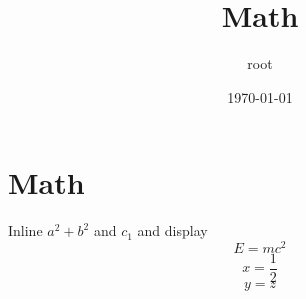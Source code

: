 \documentclass[11pt]{article}
\author{root}
\date{\today}
\title{Math}
\begin{document}
\maketitle
\tableofcontents

\section{Math}
\label{sec:orge07b9ce}
Inline \(a^2 + b^2\) and \(c_1\) and display
\[ E = mc^2 \]
$$x = \frac{1}{2}$$
\begin{equation}
y = z
\end{equation}
\end{document}
